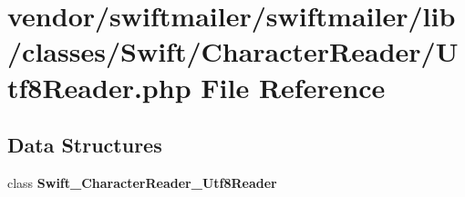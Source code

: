 \section{vendor/swiftmailer/swiftmailer/lib/classes/\+Swift/\+Character\+Reader/\+Utf8\+Reader.php File Reference}
\label{_utf8_reader_8php}
\subsection*{Data Structures}
\begin{DoxyCompactItemize}
\item 
class {\bf Swift\+\_\+\+Character\+Reader\+\_\+\+Utf8\+Reader}
\end{DoxyCompactItemize}
